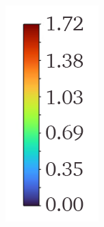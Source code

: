 \documentclass[a4paper, 11pt, oneside]{report}
\begin{document}
\begin{figure}[H]
	\centering
	\begin{subfigure}{.15\textwidth}
		\centering
		\includegraphics[width=\linewidth]{figs/mach_legend_choked.png}

\end{subfigure}
\end{figure}
\end{document}
